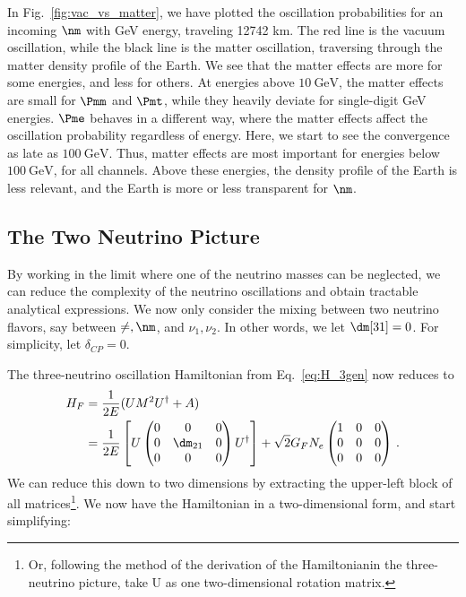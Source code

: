 In Fig.~\ref{fig:vac_vs_matter}, we have plotted the oscillation probabilities for an incoming $\nm$ with \si{\GeV} energy,
traveling 12742 km. The red line is the vacuum oscillation, while the black line is the matter oscillation, traversing through the 
matter density profile of the Earth. We see that the matter effects are more for some energies, and less for others. At energies 
above $\SI{10}{\GeV}$, the matter effects are small for $\Pmm$ and $\Pmt$, while they heavily deviate for single-digit \si{\GeV} energies.
$\Pme$ behaves in a different way, where the matter effects affect the oscillation probability regardless of energy. Here, we start to
see the convergence as late as $\SI{100}{\GeV}$. Thus, matter effects are most important for energies below $\SI{100}{\GeV}$, for all channels.
Above these energies, the density profile of the Earth is less relevant, and the Earth is more or less transparent for $\nm$.

\subsection{The Two Neutrino Picture}
By working in the limit where one of the neutrino masses can be neglected, 
we can reduce the complexity of the neutrino oscillations and obtain tractable analytical 
expressions. 
We now only consider the mixing between two neutrino flavors, say between $\ne, \nm$, and $\nu_1, \nu_2$. In other words, we let $\dm[31] = 0$. For simplicity, let $\delta_{CP} = 0$.

The three-neutrino oscillation Hamiltonian from Eq.~\eqref{eq:H_3gen}
now reduces to 
\begin{align}
    H_F &= \frac{1}{2E}(U M^2 U^\dagger + A) \nonumber \\
        &= \frac{1}{2E}\left[U \begin{pmatrix}
            0 & 0 & 0 \\
            0 & \dm_{21} & 0 \\
            0 & 0 & 0
        \end{pmatrix} U^\dagger\right] + \sqrt{2}G_F N_e \begin{pmatrix}
            1 & 0 & 0 \\
            0 & 0 & 0 \\
            0 & 0 & 0
        \end{pmatrix}\,. 
\end{align}
We can reduce this down to two dimensions by extracting the upper-left block of all matrices\footnote{Or, following the method of the derivation of the Hamiltonianin the three-
neutrino picture, take U as one two-dimensional rotation matrix.}. We now have the Hamiltonian in a two-dimensional form, and start simplifying:


